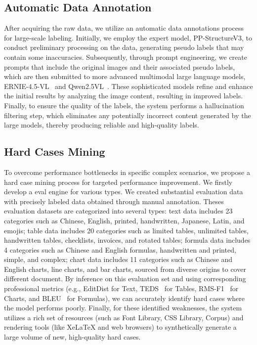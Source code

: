 \documentclass[11pt, a4paper,logo,  copyright, nonumbering]{paddleocr}
\begin{document}
\subsection{Automatic Data Annotation}
\label{Automatic Data Annotation}


After acquiring the raw data, we utilize an automatic data annotations process for large-scale labeling. Initially, we employ the expert model, PP-StructureV3, to conduct preliminary processing on the data, generating pseudo labels that may contain some inaccuracies. Subsequently, through prompt engineering, we create prompts that include the original images and their associated pseudo labels, which are then submitted to more advanced multimodal large language models, ERNIE-4.5-VL~\cite{ernie2025technicalreport} and Qwen2.5VL~\cite{bai2025qwen2}. These sophisticated models refine and enhance the initial results by analyzing the image content, resulting in improved labels. Finally, to ensure the quality of the labels, the system performs a hallucination filtering step, which eliminates any potentially incorrect content generated by the large models, thereby producing reliable and high-quality labels.



\subsection{Hard Cases Mining}
\label{Hard Cases Mining}

To overcome performance bottlenecks in specific complex scenarios, we propose a hard case mining process for targeted performance improvement. We firstly develop a eval engine for various types. We created substantial evaluation data with precisely labeled data obtained through manual annotation. Theses evaluation datasets are categorized into several types: text data includes 23 categories such as Chinese, English, printed, handwritten, Japanese, Latin, and emojis; table data includes 20 categories such as limited tables, unlimited tables, handwritten tables, checklists, invoices, and rotated tables; formula data includes 4 categories such as Chinese and English formulas, handwritten and printed, simple, and complex; chart data includes 11 categories such as Chinese and English charts, line charts, and bar charts, sourced from diverse origins to cover different document. By inference on this evaluation set and using corresponding professional metrics (e.g., EditDist for Text, TEDS~\cite{teds} for Tables, RMS-F1~\cite{deplot} for Charts, and BLEU~\cite{bleu_score} for Formulas), we can accurately identify hard cases where the model performs poorly. Finally, for these identified weaknesses, the system utilizes a rich set of resources (such as Font Library, CSS Library, Corpus) and rendering tools (like XeLaTeX and web browsers) to synthetically generate a large volume of new, high-quality hard cases. 
\end{document}
